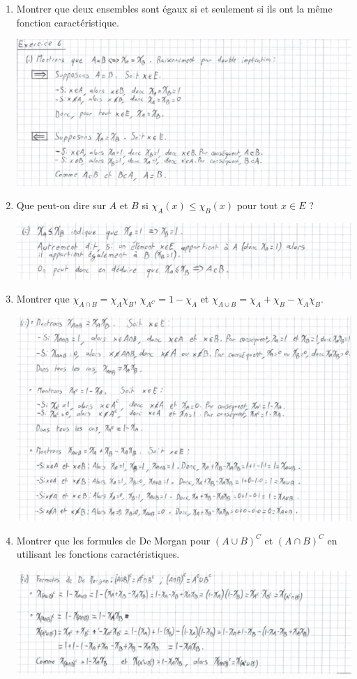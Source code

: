 \documentclass[a4paper, 10pt]{report}
\begin{document}
	\begin{enumerate}[label=(\roman*)]
		\item Montrer que deux ensembles sont égaux si et seulement
		si ils ont la même fonction caractéristique.
		
		\includegraphics{ex06-1.jpg}
		\newpage
		\item Que peut-on dire sur $A$ et $B$ si
		$\chi_A(x) \leq \chi_B(x)$ pour tout $x \in E$ ?
		
		\includegraphics{ex06-2.jpg}
		\item Montrer que $\chi_{A \cap B} = \chi_A \chi_B$,
		$\chi_{A^C} = 1 - \chi_A$ et
		$\chi_{A \cup B} = \chi_A + \chi_B - \chi_A \chi_B$.
		
		\includegraphics{ex06-3.jpg}
		\item Montrer que les formules de De Morgan pour $(A \cup B)^C$
		et $(A \cap B)^C$ en utilisant les fonctions caractéristiques.
		
		\includegraphics{ex06-4.jpg}
	\end{enumerate}
	
\end{document}

